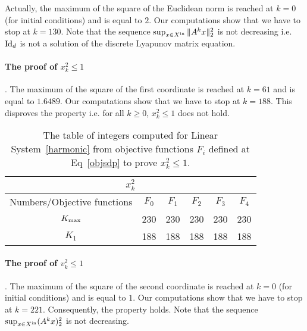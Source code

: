 \documentclass[10pt]{llncs}
\begin{document}
\vspace{-0.4cm}

Actually, the maximum of the square of the Euclidean norm is reached at $k=0$ (for initial conditions) and is equal to $2$. Our computations show that we have to stop at $k=130$. Note that the sequence $\sup_{x\in X^\mathrm{in}} \| A^k x\|_2^2$ is not decreasing i.e. $\operatorname{Id}_d$ is not a solution of the discrete Lyapunov matrix equation. 


 \paragraph{The proof of $x_{k}^2\leq 1$}. 
 The maximum of the square of the first coordinate is reached at $k=61$ and is equal to $1.6489$. Our computations show that we have to stop at $k=188$. This disproves the property i.e. for all $k\geq 0$, $x_k^2\leq 1$ does not hold.
 
\begin{table}[H]
\begin{center}
\begin{tabular}{|c|c|c|c|c|c|}
\hline
\multicolumn{6}{|c|}{$x_k^2$}\\
\hline
Numbers/Objective functions & $F_0$ & $F_{1}$ & $F_{2}$ & $F_3$ & $F_4$ \\
\hline
$K_{\rm max}$ &230 &230 & 230&230 &230 \\
\hline
 $K_{1}$ &188 &188 &188 &188 &188 \\
\hline
\end{tabular}
\end{center}
\caption{The table of integers computed for Linear System~\eqref{harmonic} from objective functions $F_i$ defined at Eq~\eqref{objsdp} to prove $x_k^2\leq 1$.}
\end{table}

\vspace{-0.2cm}

\paragraph{The proof of $v_{k}^2\leq 1$}.
The maximum of the square of the second coordinate is reached at $k=0$ (for initial conditions) and is equal to $1$. Our computations show that we have to stop at $k=221$. Consequently, the property holds. Note that the sequence $\sup_{x\in X^\mathrm{in}} (A^k x)_2^2$ is not decreasing.
\end{document}
